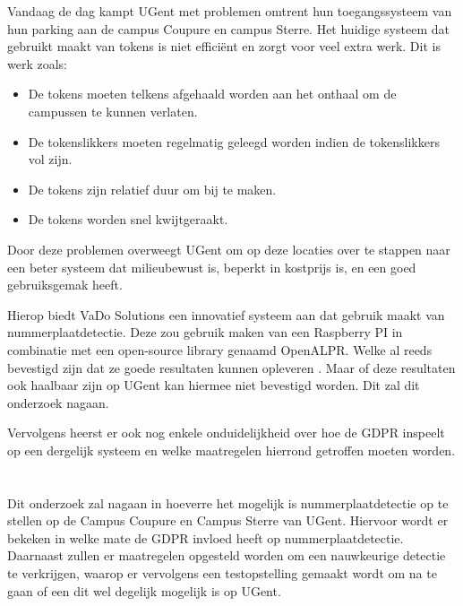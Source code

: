 Vandaag de dag kampt UGent met problemen omtrent hun toegangssysteem van hun parking aan de campus Coupure en campus Sterre. Het huidige systeem dat gebruikt maakt van tokens is niet efficiënt en zorgt voor veel extra werk. Dit is werk zoals:
\begin{itemize}
	\item De tokens moeten telkens afgehaald worden aan het onthaal om de campussen te kunnen verlaten.
	\item De tokenslikkers moeten regelmatig geleegd worden indien de tokenslikkers vol zijn.
	\item De tokens zijn relatief duur om bij te maken.
	\item De tokens worden snel kwijtgeraakt.
\end{itemize}
Door deze problemen overweegt UGent om op deze locaties over te stappen naar een beter systeem dat milieubewust is, beperkt in kostprijs is, en een goed gebruiksgemak heeft. 

Hierop biedt VaDo Solutions een innovatief systeem aan dat gebruik maakt van nummerplaatdetectie. Deze zou gebruik maken van een Raspberry PI in combinatie met een open-source library genaamd OpenALPR. Welke al reeds bevestigd zijn dat ze goede resultaten kunnen opleveren \autocite{figuerola2016automated}. Maar of deze resultaten ook haalbaar zijn op UGent kan hiermee niet bevestigd worden. Dit zal dit onderzoek nagaan.

Vervolgens heerst er ook nog enkele onduidelijkheid over hoe de GDPR inspeelt op een dergelijk systeem en welke maatregelen hierrond getroffen moeten worden.

\section{}
\label{sec:onderzoeksvraag}

Dit onderzoek zal nagaan in hoeverre het mogelijk is nummerplaatdetectie op te stellen op de Campus Coupure en Campus Sterre van UGent. Hiervoor wordt er bekeken in welke mate de GDPR invloed heeft op nummerplaatdetectie. Daarnaast zullen er maatregelen opgesteld worden om een nauwkeurige detectie te verkrijgen, waarop er vervolgens een testopstelling gemaakt wordt om na te gaan of een dit wel degelijk mogelijk is op UGent.

